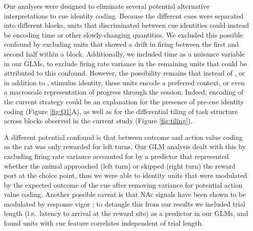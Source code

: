 \documentclass[11pt]{article}
\let\cite=\citep
\providecommand{\DIFadd}[1]{{\protect\color{red} \sf #1}} %
\providecommand{\DIFdel}[1]{} %
\providecommand{\DIFaddbegin}{} %
\providecommand{\DIFaddend}{} %
\providecommand{\DIFdelbegin}{} %
\providecommand{\DIFdelend}{} %
\newcommand{\DIFscaledelfig}{0.5}
\newlength{\DIFdelgraphicswidth} %
\newlength{\DIFdelgraphicsheight} %
\newcommand{\DIFaddincludegraphics}[2][]{{\color{red}\fbox{\DIFOincludegraphics[#1]{#2}}}} %
\newcommand{\DIFdelincludegraphics}[2][]{%
\sbox{\DIFdelgraphicsbox}{\DIFOincludegraphics[#1]{#2}}%
\settoboxwidth{\DIFdelgraphicswidth}{\DIFdelgraphicsbox} %
\settoboxtotalheight{\DIFdelgraphicsheight}{\DIFdelgraphicsbox} %
\scalebox{\DIFscaledelfig}{%
\parbox[b]{\DIFdelgraphicswidth}{\usebox{\DIFdelgraphicsbox}\\[-\baselineskip] \rule{\DIFdelgraphicswidth}{0em}}\llap{\resizebox{\DIFdelgraphicswidth}{\DIFdelgraphicsheight}{%
\setlength{\unitlength}{\DIFdelgraphicswidth}%
\begin{picture}(1,1)%
\thicklines\linethickness{2pt} %
{\color[rgb]{1,0,0}\put(0,0){\framebox(1,1){}}}%
{\color[rgb]{1,0,0}\put(0,0){\line( 1,1){1}}}%
{\color[rgb]{1,0,0}\put(0,1){\line(1,-1){1}}}%
\end{picture}%
}\hspace*{3pt}}} %
} %
\DeclareRobustCommand{\DIFaddbegin}{\DIFOaddbegin \let\includegraphics\DIFaddincludegraphics} %
\DeclareRobustCommand{\DIFaddend}{\DIFOaddend \let\includegraphics\DIFOincludegraphics} %
\DeclareRobustCommand{\DIFdelbegin}{\DIFOdelbegin \let\includegraphics\DIFdelincludegraphics} %
\DeclareRobustCommand{\DIFdelend}{\DIFOaddend \let\includegraphics\DIFOincludegraphics} %
\begin{document}
Our analyses were designed to eliminate several potential alternative interpretations to cue identity coding. Because the different cues were separated into different blocks, units that discriminated between cue identities could instead be encoding time or other slowly-changing quantities. We excluded this possible confound by excluding units that showed a drift in firing between the first and second half within a block. \DIFaddbegin \DIFadd{Additionally, we included time as a nuisance variable in our GLMs, to exclude firing rate variance in the remaining units that could be attributed to this confound. }\DIFaddend However, the \DIFdelbegin \DIFdel{possiblity }\DIFdelend \DIFaddbegin \DIFadd{possibility }\DIFaddend remains that instead of\DIFaddbegin \DIFadd{, }\DIFaddend or in addition to\DIFaddbegin \DIFadd{, }\DIFaddend stimulus identity, these units encode a preferred context, or even a macroscale representation of progress through the session. Indeed, encoding of the current strategy could be an explanation for the \DIFdelbegin \DIFdel{sustained difference in population averaged firing across stimulus
blocks (Figure \ref{fig:pop}}\DIFdelend \DIFaddbegin \DIFadd{presence of pre-cue identity coding (Figure \ref{fig:Q1}A}\DIFaddend ), as well as \DIFdelbegin \DIFdel{a potential explanation for the differentially }\DIFdelend \DIFaddbegin \DIFadd{for the differential }\DIFaddend tiling of task structure across blocks \DIFaddbegin \DIFadd{observed }\DIFaddend in the current study (Figure \ref{fig:tiling}).

A different potential confound is that between outcome and action value coding \DIFdelbegin \DIFdel{. We discriminated between these possiblities by analzying
error trials, where the rat appraoched reward }\DIFdelend \DIFaddbegin \DIFadd{as the rat was only rewarded for left turns. Our GLM analysis dealt with this by excluding firing rate variance accounted for by a predictor that represented whether the animal approached }\DIFaddend (left turn) \DIFdelbegin \DIFdel{after
presentation of the reward-unavailable cue. Units }\DIFdelend \DIFaddbegin \DIFadd{or skipped (right turn) the reward port at the choice point, thus we were able to identity units }\DIFaddend that were modulated by the expected outcome of the cue \DIFdelbegin \DIFdel{maintained their specific firing
patterns even during error trials, as expected from outcome value
coding but not }\DIFdelend \DIFaddbegin \DIFadd{after removing variance for potential }\DIFaddend action value coding. \DIFdelbegin \DIFdel{Additionally, }\DIFdelend \DIFaddbegin \DIFadd{Another possible caveat is that }\DIFaddend NAc signals have been shown to be modulated by response vigor \cite{McGinty2013}; to detangle this from our results we included trial length (i.e.\ latency to arrival at the reward site) as a predictor in our GLMs, and found units with cue feature correlates independent of trial length.
\end{document}
